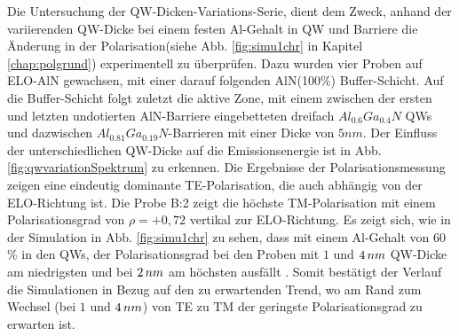\noindent
Die Untersuchung der QW-Dicken-Variations-Serie, dient dem Zweck, anhand der variierenden QW-Dicke bei einem festen Al-Gehalt in QW und Barriere die Änderung in der Polarisation(siehe Abb. \ref{fig:simu1chr} in Kapitel \ref{chap:polgrund}) experimentell zu \"uberpr\"ufen. Dazu wurden vier Proben auf ELO-AlN gewachsen, mit einer darauf folgenden AlN(100\%) Buffer-Schicht. Auf die Buffer-Schicht folgt zuletzt die aktive Zone, mit einem zwischen der ersten und letzten undotierten AlN-Barriere eingebetteten dreifach $Al_{0.6}Ga_{0.4}N$ QWs und dazwischen $Al_{0.81}Ga_{0.19}N$-Barrieren mit einer Dicke von $5nm$. 
Der Einfluss der unterschiedlichen QW-Dicke auf die Emissionsenergie ist in Abb. \ref{fig:qwvariationSpektrum} zu erkennen.
\newline
Die Ergebnisse der Polarisationsmessung zeigen eine eindeutig dominante TE-Polarisation, die auch abh\"angig von der ELO-Richtung ist. Die Probe B:2 zeigt die h\"ochste TM-Polarisation mit einem Polarisationsgrad von $\rho=+0,72$ vertikal zur ELO-Richtung. 
\newline Es zeigt sich, wie in der Simulation
in Abb. \ref{fig:simu1chr} zu sehen, dass mit einem Al-Gehalt von $60$\% in den QWs, der Polarisationsgrad bei den Proben mit $1$ und $4 \thinspace nm$ QW-Dicke am niedrigsten und bei $2 \thinspace nm$ am h\"ochsten ausf\"allt . Somit best\"atigt der Verlauf die Simulationen in Bezug auf den zu erwartenden Trend, wo am Rand zum Wechsel (bei $1$ und $4 \thinspace nm$) von TE zu TM der geringste Polarisationsgrad zu erwarten ist.
